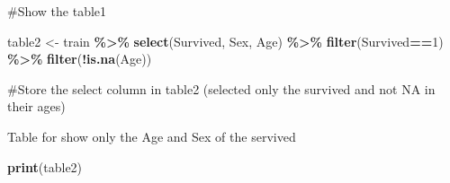 \documentclass[
]{article}
\newenvironment{Shaded}{\begin{snugshade}}{\end{snugshade}}
\newcommand{\DecValTok}[1]{\textcolor[rgb]{0.00,0.00,0.81}{#1}}
\newcommand{\FunctionTok}[1]{\textcolor[rgb]{0.13,0.29,0.53}{\textbf{#1}}}
\newcommand{\NormalTok}[1]{#1}
\newcommand{\OtherTok}[1]{\textcolor[rgb]{0.56,0.35,0.01}{#1}}
\newcommand{\SpecialCharTok}[1]{\textcolor[rgb]{0.81,0.36,0.00}{\textbf{#1}}}
\begin{document}
\#Show the table1

\begin{Shaded}
\begin{Highlighting}[]
\NormalTok{table2 }\OtherTok{\textless{}{-}}\NormalTok{ train }\SpecialCharTok{\%\textgreater{}\%}
  \FunctionTok{select}\NormalTok{(Survived, Sex, Age) }\SpecialCharTok{\%\textgreater{}\%}
  \FunctionTok{filter}\NormalTok{(Survived}\SpecialCharTok{==}\DecValTok{1}\NormalTok{) }\SpecialCharTok{\%\textgreater{}\%}
  \FunctionTok{filter}\NormalTok{(}\SpecialCharTok{!}\FunctionTok{is.na}\NormalTok{(Age))}
\end{Highlighting}
\end{Shaded}

\#Store the select column in table2 (selected only the survived and not
NA in their ages)

Table for show only the Age and Sex of the servived

\begin{Shaded}
\begin{Highlighting}[]
\FunctionTok{print}\NormalTok{(table2)}
\end{Highlighting}
\end{Shaded}
\end{document}

